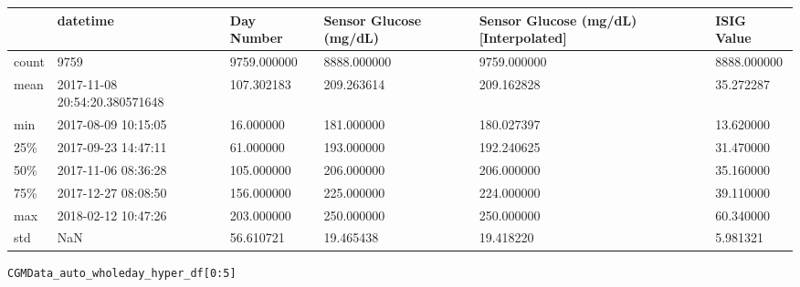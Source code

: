 \bigskip\noindent
\begin{tabular}{p{}p{}p{}p{}p{}p{}}
\toprule
 & datetime & Day Number & Sensor Glucose (mg/dL) & Sensor Glucose (mg/dL) [Interpolated] & ISIG Value \\
\hline
count & 9759 & 9759.000000 & 8888.000000 & 9759.000000 & 8888.000000 \\
\hline
mean & 2017-11-08 20:54:20.380571648 & 107.302183 & 209.263614 & 209.162828 & 35.272287 \\
\hline
min & 2017-08-09 10:15:05 & 16.000000 & 181.000000 & 180.027397 & 13.620000 \\
\hline
25\% & 2017-09-23 14:47:11 & 61.000000 & 193.000000 & 192.240625 & 31.470000 \\
\hline
50\% & 2017-11-06 08:36:28 & 105.000000 & 206.000000 & 206.000000 & 35.160000 \\
\hline
75\% & 2017-12-27 08:08:50 & 156.000000 & 225.000000 & 224.000000 & 39.110000 \\
\hline
max & 2018-02-12 10:47:26 & 203.000000 & 250.000000 & 250.000000 & 60.340000 \\
\hline
std & NaN & 56.610721 & 19.465438 & 19.418220 & 5.981321 \\
\hline
\bottomrule
\end{tabular}

\bigskip

\begin{verbatim}
CGMData_auto_wholeday_hyper_df[0:5]
\end{verbatim}


